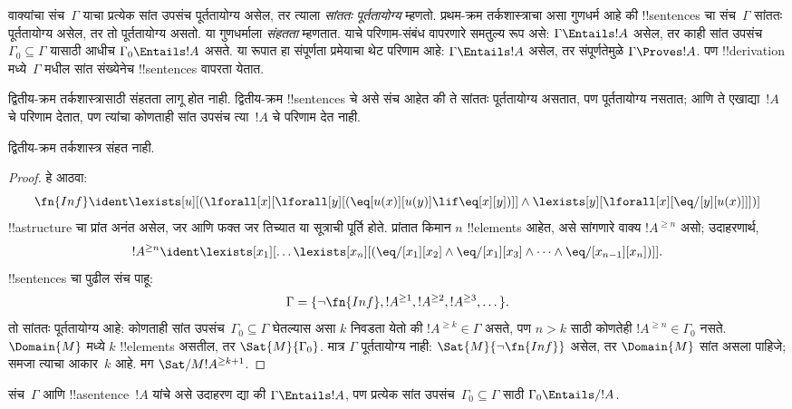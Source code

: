 \documentclass[../../../include/open-logic-section]{subfiles}
\begin{document}


\begin{explain}
वाक्यांचा संच~$\Gamma$ याचा प्रत्येक सांत उपसंच
पूर्ततायोग्य असेल, तर त्याला \emph{सांततः पूर्ततायोग्य}
म्हणतो. प्रथम-क्रम तर्कशास्त्राचा असा गुणधर्म आहे की
!!{sentence}s चा संच~$\Gamma$ सांततः पूर्ततायोग्य
असेल, तर तो पूर्ततायोग्य असतो. या गुणधर्माला
\emph{संहतता} म्हणतात. याचे परिणाम-संबंध वापरणारे
समतुल्य रूप असे: $\Gamma \Entails !A$ असेल,
तर काही सांत उपसंच~$\Gamma_0 \subseteq \Gamma$
यासाठी आधीच $\Gamma_0 \Entails
!A$ असते. या रूपात हा संपूर्णता प्रमेयाचा थेट
परिणाम आहे: $\Gamma \Entails !A$ असेल, तर
संपूर्णतेमुळे $\Gamma \Proves !A$. पण
!!{derivation} मध्ये~$\Gamma$ मधील सांत
संख्येनेच !!{sentence}s वापरता येतात.

द्वितीय-क्रम तर्कशास्त्रासाठी संहतता लागू होत नाही.
द्वितीय-क्रम !!{sentence}s चे असे संच आहेत की ते
सांततः पूर्ततायोग्य असतात, पण पूर्ततायोग्य नसतात;
आणि ते एखाद्या~$!A$ चे परिणाम देतात, पण त्यांचा
कोणताही सांत उपसंच त्या~$!A$ चे परिणाम देत नाही.
\end{explain}


\begin{thm}
द्वितीय-क्रम तर्कशास्त्र संहत नाही.
\end{thm}

\begin{proof}
हे आठवा:
\[
\fn{Inf} \ident \lexists[u][(\lforall[x][\lforall[y][(\eq[u(x)][u(y)]
      \lif \eq[x][y])]] \land \lexists[y][\lforall[x][\eq/[y][u(x)]]])]
\]
!!a{structure} चा प्रांत अनंत असेल, जर आणि फक्त जर
तिच्यात या सूत्राची पूर्ति होते. प्रांतात किमान
$n$ !!{element}s आहेत, असे सांगणारे वाक्य
$!A^{\ge n}$ असो; उदाहरणार्थ,
\[
!A^{\ge n} \ident \lexists[x_1][\dots\lexists[x_n][(\eq/[x_1][x_2]
    \land \eq/[x_1][x_3] \land \dots \land \eq/[x_{n-1}][x_n])]].
\]
!!{sentence}s चा पुढील संच पाहू:
\[
\Gamma = \{\lnot \fn{Inf}, !A^{\ge 1}, !A^{\ge 2}, !A^{\ge 3}, \dots\}.
\]
तो सांततः पूर्ततायोग्य आहे: कोणताही सांत उपसंच~$\Gamma_0
\subseteq \Gamma$ घेतल्यास असा $k$ निवडता येतो की
$!A^{\ge k} \in \Gamma$ असते, पण $n>k$ साठी
कोणतेही $!A^{\ge n} \in \Gamma_0$ नसते.
$\Domain{M}$ मध्ये $k$ !!{element}s असतील, तर
$\Sat{M}{\Gamma_0}$. मात्र $\Gamma$ पूर्ततायोग्य
नाही: $\Sat{M}{\lnot \fn{Inf}}$ असेल, तर
$\Domain{M}$ सांत असला पाहिजे; समजा त्याचा
आकार~$k$ आहे. मग $\Sat/{M}{!A^{\ge k+1}}$.
\end{proof}

\begin{prob}
संच~$\Gamma$ आणि !!a{sentence}~$!A$ यांचे असे
उदाहरण द्या की $\Gamma \Entails !A$, पण प्रत्येक
सांत उपसंच~$\Gamma_0 \subseteq
\Gamma$ साठी $\Gamma_0 \Entails/ !A$.
\end{prob}
\end{document}
